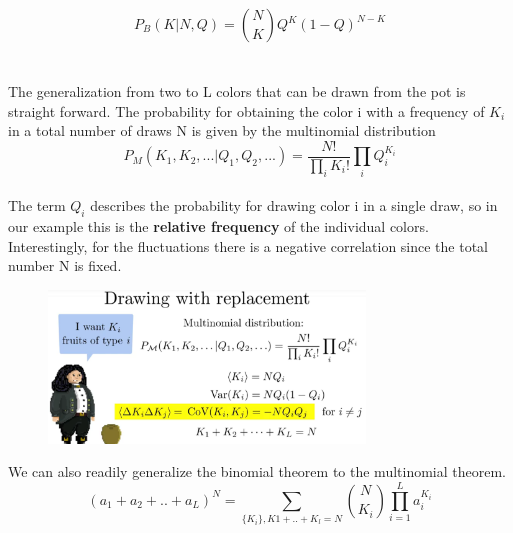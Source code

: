 \documentclass[12pt, a4paper]{scrartcl}
\begin{document}
\begin{equation*}\boxed{P_B(K|N,Q)={N\choose K}Q^K(1-Q)^{N-K}
}\end{equation*}\\
\\

The generalization from two to L colors that can be drawn from the pot is straight forward.
The probability for obtaining the color i with a frequency of $K_i$ in a total number of draws N is given by the multinomial distribution
\begin{equation*}\boxed{P_M(K_1,K_2,...|Q_1,Q_2,...)=\frac{N!}{\prod_iK_i!}\prod_iQ_i^{K_i}}\end{equation*}\\
The term $Q_i$ describes the probability for drawing color i in a single draw, so in our example this is the \textbf{relative frequency} of the individual colors.
Interestingly, for the fluctuations there is a negative correlation since the total number N is fixed.
 \begin{figure}[H]
	\centering
	\includegraphics[width=0.75\textwidth]{4_6.png}
\end{figure}
We can also readily generalize the binomial theorem to the multinomial theorem.\\%
\begin{equation*}\boxed{(a_1+a_2+..+a_L)^N=\sum_{\{K_i\}, K1+..+K_l=N}{N\choose{K_i}}\prod_{i=1}^{L}a_i^{K_i}
}\end{equation*}\\
\\
\end{document}
